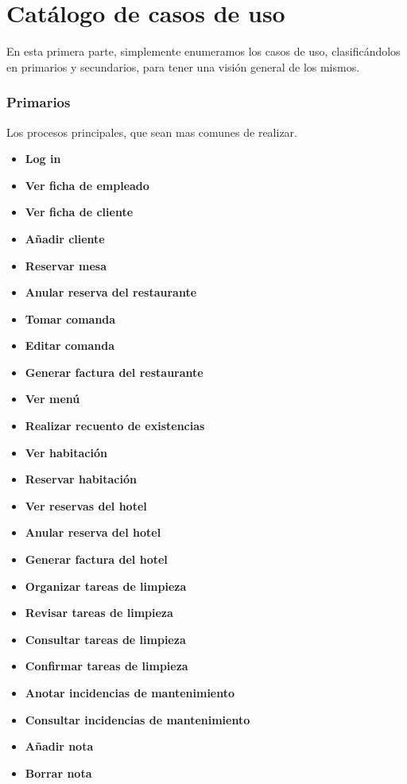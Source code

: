 \documentclass[spanish,a4paper,11pt, twoside]{report}	%
\begin{document}

\setcounter{section}{0}

\part{Catálogo de casos de uso} %
	En esta primera
	parte, simplemente enumeramos los casos de uso, clasificándolos en primarios y
	secundarios, para tener una visión general de los mismos.
\section{Primarios}     %
	Los procesos principales, que sean mas comunes de realizar.
	\begin{itemize}
	\item \textbf{Log in}	
	\item \textbf{Ver ficha de empleado}
	\item \textbf{Ver ficha de cliente}
	\item \textbf{Añadir cliente}
	\item \textbf{Reservar mesa}
	\item \textbf{Anular reserva del restaurante}
	\item \textbf{Tomar comanda}
	\item \textbf{Editar comanda}
	\item \textbf{Generar factura del restaurante}
	\item \textbf{Ver menú}
	\item \textbf{Realizar recuento de existencias}
	\item \textbf{Ver habitación}	
	\item \textbf{Reservar habitación}
	\item \textbf{Ver reservas del hotel}
	\item \textbf{Anular reserva del hotel}
	\item \textbf{Generar factura del hotel}
	\item \textbf{Organizar tareas de limpieza}
	\item \textbf{Revisar tareas de limpieza}
	\item \textbf{Consultar tareas de limpieza}
	\item \textbf{Confirmar tareas de limpieza}
	\item \textbf{Anotar incidencias de mantenimiento}	
	\item \textbf{Consultar incidencias  de mantenimiento}
	\item \textbf{Añadir nota}
	\item \textbf{Borrar nota}
	\end{itemize}
\end{document}
